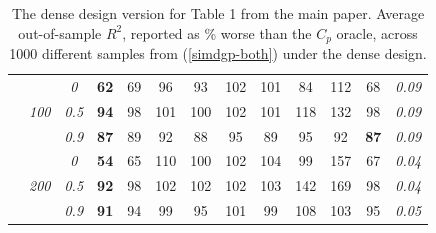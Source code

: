 \documentclass[12pt]{article}
\begin{document}
\begin{table}
\begin{center}
\begin{tabular}{ccc|cc|cc|cc|cc|c|c}
& & \it  0  & {\bf 62} & 69 & 96 & 93 & 102 & 101 & 84 & 112 & 68 & \it  0.09 \\
 & \it  100  & \it  0.5  & {\bf 94} & 98 & 101 & 100 & 102 & 101 & 118 & 132 & 98 & \it  0.09 \\
& & \it  0.9  & {\bf 87} & 89 & 92 & 88 & 95 & 89 & 95 & 92 & {\bf 87} & \it  0.09 \\[1ex]
\cline{2-3}\rule{0pt}{3ex}
& & \it  0  & {\bf 54} & 65 & 110 & 100 & 102 & 104 & 99 & 157 & 67 & \it  0.04 \\
 & \it  200  & \it  0.5  & {\bf 92} & 98 & 102 & 102 & 102 & 103 & 142 & 169 & 98 & \it  0.04 \\
& & \it  0.9  & {\bf 91} & 94 & 99 & 95 & 101 & 99 & 108 & 103 & 95 & \it  0.05 \\[1ex]
\hline
\end{tabular}
\end{center}
\caption{\label{tab:simdense} The dense design version for Table 1 from the main paper.  Average out-of-sample $R^2$, reported as  \% worse than the $C_p$ oracle, across 1000 different samples from (\ref{simdgp-both}) under the dense design. }  
\end{table}


\end{document}
